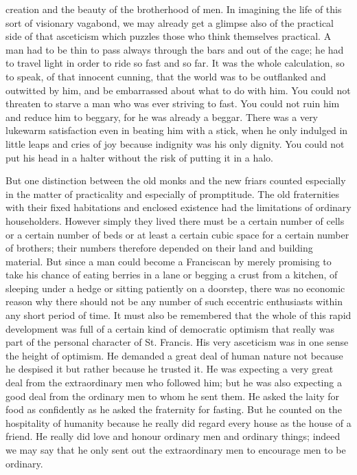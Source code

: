 \documentclass{book}
\begin{document}
creation and the beauty of the brotherhood of men. In imagining the life of this sort of visionary vagabond, we may already get a glimpse also of the practical side of that asceticism which puzzles those who think themselves practical. A man had to be thin to pass always through the bars and out of the cage; he had to travel light in order to ride so fast and so far. It was the whole calculation, so to speak, of that innocent cunning, that the world was to be outflanked and outwitted by him, and be embarrassed about what to do with him. You could not threaten to starve a man who was ever striving to fast. You could not ruin him and reduce him to beggary, for he was already a beggar. There was a very lukewarm satisfaction even in beating him with a stick, when he only indulged in little leaps and cries of joy because indignity was his only dignity. You could not put his head in a halter without the risk of putting it in a halo.

But one distinction between the old monks and the new friars counted especially in the matter of practicality and especially of promptitude. The old fraternities with their fixed habitations and enclosed existence had the limitations of ordinary householders. However simply they lived there must be a certain number of cells or a certain number of beds or at least a certain cubic space for a certain number of brothers; their numbers therefore depended on their land and building material. But since a man could become a Franciscan by merely promising to take his chance of eating berries in a lane or begging a crust from a kitchen, of sleeping under a hedge or sitting patiently on a doorstep, there was no economic reason why there should not be any number of such eccentric enthusiasts within any short period of time. It must also be remembered that the whole of this rapid development was full of a certain kind of democratic optimism that really was part of the personal character of St. Francis. His very asceticism was in one sense the height of optimism. He demanded a great deal of human nature not because he despised it but rather because he trusted it. He was expecting a very great deal from the extraordinary men who followed him; but he was also expecting a good deal from the ordinary men to whom he sent them. He asked the laity for food as confidently as he asked the fraternity for fasting. But he counted on the hospitality of humanity because he really did regard every house as the house of a friend. He really did love and honour ordinary men and ordinary things; indeed we may say that he only sent out the extraordinary men to encourage men to be ordinary.
\end{document}
